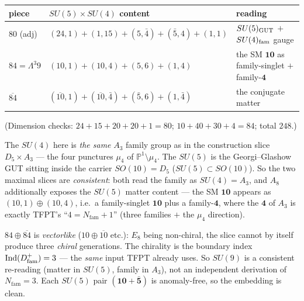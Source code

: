 \documentclass[11pt,a4paper]{article}
\newcommand{\Nfam}{N_{\mathrm{fam}}}
\newcommand{\PP}{\mathbb{P}}
\theoremstyle{definition}
\renewcommand{\arraystretch}{1.15}
\begin{document}
\begin{center}\small
\renewcommand{\arraystretch}{1.2}
\begin{tabularx}{\linewidth}{@{}llY@{}}
\toprule
piece & $SU(5)\times SU(4)$ content & reading \\
\midrule
$80$ (adj) & $(24,1){+}(1,15){+}(5,\bar4){+}(\bar5,4){+}(1,1)$ & $SU(5)_{\rm GUT}$ $+$ $SU(4)_{\rm fam}$ gauge \\
$84=\Lambda^3 9$ & $(10,1){+}(10,4){+}(5,6){+}(1,4)$ & the SM $\mathbf{10}$ as family-singlet $+$ family-$\mathbf4$ \\
$\overline{84}$ & $(\overline{10},1){+}(\overline{10},\bar4){+}(\bar5,6){+}(1,\bar4)$ & the conjugate matter \\
\bottomrule
\end{tabularx}
\end{center}

\noindent (Dimension checks: $24{+}15{+}20{+}20{+}1=80$; $10{+}40{+}30{+}4=84$; total $248$.)

\begin{winbox}
The $SU(4)$ here is \emph{the same} $A_3$ family group as in the construction slice $D_5\times A_3$ --- the
four punctures $\mu_4$ of $\PP^1\setminus\mu_4$. The $SU(5)$ is the Georgi--Glashow GUT sitting inside the
carrier $SO(10)=D_5$ ($SU(5)\subset SO(10)$). So the two maximal slices are \emph{consistent}: both read
the family as $SU(4){=}A_3$, and $A_8$ additionally exposes the $SU(5)$ matter content --- the SM
$\mathbf{10}$ appears as $(10,1)\oplus(10,4)$, i.e.\ a family-singlet $\mathbf{10}$ plus a family-$\mathbf4$,
where the $\mathbf4$ of $A_3$ is exactly TFPT's ``$4=\Nfam+1$'' (three families $+$ the $\mu_4$ direction).
\end{winbox}

\begin{gapbox}
$84\oplus\overline{84}$ is \emph{vectorlike} ($10\oplus\overline{10}$ etc.): $E_8$ being non-chiral, the
slice cannot by itself produce three \emph{chiral} generations. The chirality is the boundary index
$\operatorname{Ind}(D^+_{\rm fam})=3$ --- the \emph{same} input TFPT already uses. So $SU(9)$ is a
consistent re-reading (matter in $SU(5)$, family in $A_3$), not an independent derivation of $\Nfam=3$.
Each $SU(5)$ pair $(\mathbf{10}+\bar{\mathbf5})$ is anomaly-free, so the embedding is clean. \mC
\end{gapbox}
\end{document}
